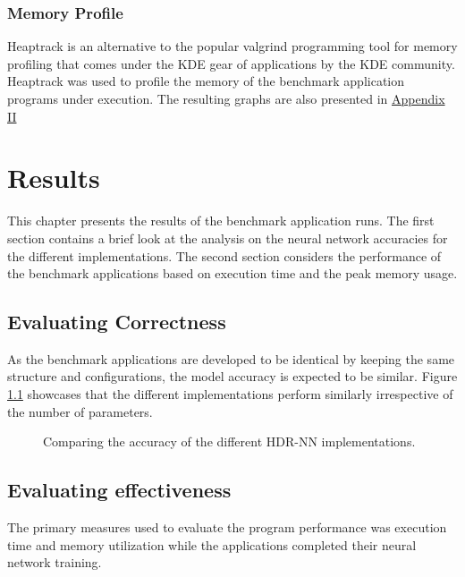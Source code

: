 \subsection{Memory Profile}

Heaptrack is an alternative to the popular valgrind programming tool for memory profiling that comes under the KDE gear of applications by the KDE community. Heaptrack was used to profile the memory of the benchmark application programs under execution. The resulting graphs are also presented in \hyperref[hdrnn-memory-profile]{Appendix II}



\chapter{Results}

This chapter presents the results of the benchmark application runs. The first section contains a brief look at the analysis on the neural network accuracies for the different implementations. The second section considers the performance of the benchmark applications based on execution time and the peak memory usage.

\section{Evaluating Correctness}

As the benchmark applications are developed to be identical by keeping the same structure and configurations, the model accuracy is expected to be similar. Figure \ref{hdrnn-accuracy} showcases that the different implementations perform similarly irrespective of the number of parameters.

\begin{figure}[!ht]
	\centering
	
	\caption[HDR-NN Accuracy]{Comparing the accuracy of the different HDR-NN implementations.}
	\label{hdrnn-accuracy}
\end{figure}

\section{Evaluating effectiveness}

The primary measures used to evaluate the program performance was execution time and memory utilization while the applications completed their neural network training.

